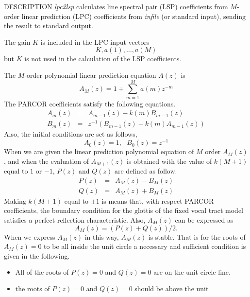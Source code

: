 \begin{qsection}{DESCRIPTION}
{\em lpc2lsp} calculates line spectral pair (LSP) coefficients 
from $M$-order linear prediction (LPC) coefficients 
from {\em infile} (or standard input),
sending the result to standard output.

The gain $K$ is included in the LPC input vectors
\begin{displaymath}
  K, a(1), \ldots, a(M)
\end{displaymath}
but $K$ is not used in the calculation of the LSP coefficients.

The $M$-order polynomial linear prediction equation $A(z)$ is
\begin{displaymath}
  A_M(z) = 1 + \sum_{m=1}^M a(m) z^{-m}
\end{displaymath}
The PARCOR coefficients satisfy the following equations.
\begin{eqnarray*}
  A_m(z) &=& A_{m-1}(z) - k(m) B_{m-1}(z) \\
  B_m(z) &=& z^{-1} (B_{m-1}(z) - k(m) A_{m-1}(z))
\end{eqnarray*}
Also, the initial conditions are set as follows,
\begin{displaymath}
  A_0(z) = 1,~~~B_0(z) = z^{-1}
\end{displaymath}
When we are given the linear prediction polynomial equation
of $M$ order $A_M(z)$, and when the evaluation of $A_{M+1}(z)$
is obtained with the value of $k(M+1)$ equal to $1$ or $-1$, 
$P(z)$ and $Q(z)$ are defined as follow.
\begin{eqnarray*}
  P(z) &=& A_M(z) - B_M(z) \\
  Q(z) &=& A_M(z) + B_M(z)
\end{eqnarray*}
Making $k(M+1)$ equal to $\pm 1$ is means that,
with respect PARCOR coefficients,
the boundary condition for the glottis of the fixed vocal tract model
satisfies a perfect reflection characteristic.
Also, $A_M(z)$ can be expressed as
\begin{displaymath}
  A_M(z) = ( P(z) + Q(z) ) / 2.
\end{displaymath}
When we express $A_M(z)$ in this way,
$A_M(z)$ is stable.
That is for the roots of $A_M(z)=0$ to be all inside
the unit circle a necessary and sufficient condition is given
in the following.
\begin{itemize}
\item All of the roots of $P(z)=0$ and $Q(z)=0$ are on the unit circle
      line.
\item the roots of $P(z)=0$ and $Q(z)=0$ should be above the unit

\end{itemize}
\end{qsection}
